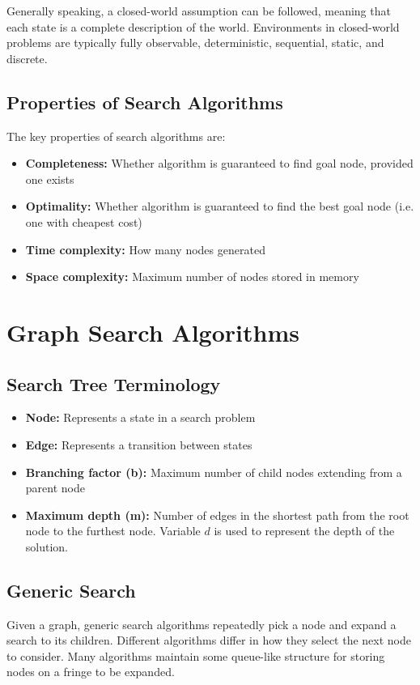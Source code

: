\documentclass[12pt,titlepage]{article}
\begin{document}
      Generally speaking, a closed-world assumption can be followed, meaning that each state is a complete description of the world.
      Environments in closed-world problems are typically fully observable, deterministic, sequential, static, and discrete.

    \subsection{Properties of Search Algorithms}
      The key properties of search algorithms are:
      \begin{itemize}
        \item \textbf{Completeness:} Whether algorithm is guaranteed to find goal node, provided one exists
        \item \textbf{Optimality:} Whether algorithm is guaranteed to find the best goal node (i.e. one with cheapest cost)
        \item \textbf{Time complexity:} How many nodes generated
        \item \textbf{Space complexity:} Maximum number of nodes stored in memory
      \end{itemize}

  \newpage

  \section{Graph Search Algorithms}

    \subsection{Search Tree Terminology}
      \begin{itemize}
        \item \textbf{Node:} Represents a state in a search problem
        \item \textbf{Edge:} Represents a transition between states
        \item \textbf{Branching factor (b):} Maximum number of child nodes extending from a parent node
        \item \textbf{Maximum depth (m):} Number of edges in the shortest path from the root node to the furthest node.
        Variable $d$ is used to represent the depth of the solution.
      \end{itemize}

    \subsection{Generic Search}
      Given a graph, generic search algorithms repeatedly pick a node and expand a search to its children. Different algorithms
      differ in how they select the next node to consider. Many algorithms maintain some queue-like structure for storing nodes
      on a fringe to be expanded.
\end{document}
